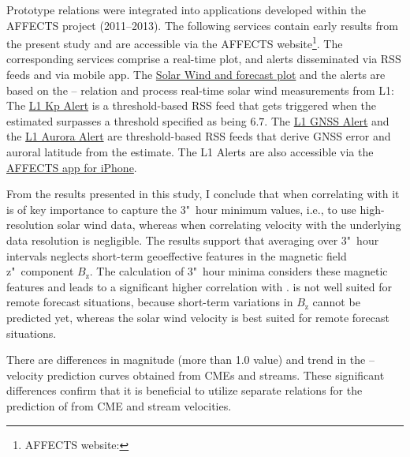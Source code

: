 Prototype \Kp{} relations were integrated into applications developed within the AFFECTS project (2011--2013). The following services contain early results from the present \Kp{} study and are accessible via the \mbox{AFFECTS} website\footnote{AFFECTS website: }. The corresponding services comprise a real-time plot, and alerts disseminated via RSS feeds and via mobile app. The \href{http://www.affects-fp7.eu/rssfeeds/ace_ap_forecast_plot/ace_realtime_ap_CH_GFT_plot.png}{Solar Wind and \Kp{} forecast plot} and the alerts are based on the \Kp--\vBz{} relation and process real-time solar wind measurements from L1: The \href{http://www.affects-fp7.eu/rssfeeds/rssfeed_kp/rssfeed_kp.xml}{L1 Kp Alert} is a threshold-based RSS feed that gets triggered when the estimated \Kp{} surpasses a threshold specified as being $6.7$. The \href{http://www.affects-fp7.eu/rssfeeds/rssfeed_gnss/rssfeed_gnss.xml}{L1 GNSS Alert} and the \href{http://www.affects-fp7.eu/rssfeeds/rssfeed_aurora/rssfeed_aurora.xml}{L1 Aurora Alert} are threshold-based RSS feeds that derive GNSS error and auroral latitude from the \Kp{} estimate. The L1 Alerts are also accessible via the \href{https://itunes.apple.com/au/app/affects/id893579846}{AFFECTS app for iPhone}.

\medskip

From the results presented in this study, I conclude that when correlating \vBz{} with \Kp{} it is of key importance to capture the 3"~hour minimum values, i.e., to use high-resolution solar wind data, whereas when correlating velocity with \Kp{} the underlying data resolution is negligible. The results support that averaging over 3"~hour intervals neglects short-term geoeffective features in the magnetic field z"~component $B_\text{z}$. The calculation of 3"~hour minima considers these magnetic features and leads to a significant higher correlation with \Kp{}. \vBz{} is not well suited for remote forecast situations, because short-term variations in $B_\text{z}$ cannot be predicted yet, whereas the solar wind velocity is best suited for remote forecast situations.

There are differences in magnitude (more than 1.0 \Kp{} value) and trend in the \Kp--velocity prediction curves obtained from CMEs and streams. These significant differences confirm that it is beneficial to utilize separate relations for the prediction of \Kp{} from CME and stream velocities.

